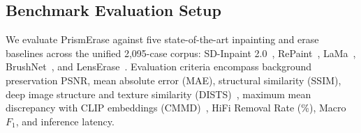 \documentclass[11pt,a4paper]{article}
\begin{document}
\subsection{Benchmark Evaluation Setup}
We evaluate PrismErase against five state-of-the-art inpainting and erase baselines across the unified 2,095-case corpus: SD-Inpaint 2.0~\cite{rombach2022high}, RePaint~\cite{lugmayr2022repaint}, LaMa~\cite{suvorov2022resolution}, BrushNet~\cite{ju2024brushnet}, and LensErase~\cite{lenserase2026}. Evaluation criteria encompass background preservation PSNR, mean absolute error (MAE), structural similarity (SSIM), deep image structure and texture similarity (DISTS)~\cite{ding2020image}, maximum mean discrepancy with CLIP embeddings (CMMD)~\cite{jayasinghe2024evaluating}, HiFi Removal Rate (\%), Macro $F_1$, and inference latency.

\begin{table}[h!]
\centering
\caption{\textbf{Comprehensive Quantitative Comparison against SOTA on Unified 2,095-Case Corpus.}}
\label{tab:sota}
\vspace{-4pt}
\end{table}
\end{document}
